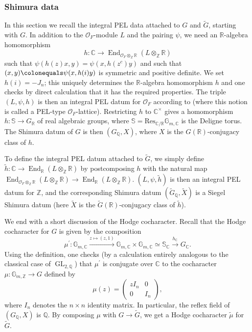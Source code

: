 \documentclass{amsart}
\theoremstyle{remark}
\numberwithin{equation}{subsection}
\def\C{\CC}
\newcommand{\Q}{\QQ}
\newcommand{\R}{\RR}
\newcommand{\Z}{\ZZ}
\newcommand{\CC}{{\mathbb C}}
\newcommand{\GG}{{\mathbb G}}
\newcommand{\QQ}{{\mathbb Q}}
\newcommand{\RR}{{\mathbb R}}
\renewcommand{\SS}{{\mathbb S}}
\newcommand{\ZZ}{{\mathbb Z}}
\newcommand{\cO}{{\mathcal O}}
\DeclareMathOperator{\End}{End}
\DeclareMathOperator{\GL}{GL}
\newcommand{\tG}{\widetilde{G}}
\newcommand{\wt}{\widetilde}
\newcommand{\defeq}{\colonequals}
\renewcommand{\(}{\left(}
\renewcommand{\)}{\right)}
\begin{document}
\subsubsection{Shimura data}\label{subsubsect:Sh_datum}
In this section we recall the integral PEL data attached to $G$ and $\tG$, starting with $G$. In addition to the $\cO_F$-module $L$ and the pairing $\psi$, we need an $\R$-algebra homomorphism
\[
h \colon \C \to \End_{\cO_F \otimes_\Z \R}(L\otimes_\Z \R)
\] 
such that $\psi(h(z)x,y)=\psi(x,h(z^c)y)$ and such that $(x,y) \defeq \psi(x,h(i)y)$ is symmetric and positive definite. We set $h(i) = -J_n$; this uniquely determines the $\R$-algebra homomorphism $h$ and one checks by direct calculation that it has the required properties. The triple $(L,\psi,h)$ is then an integral PEL datum for $\cO_F$ according to \cite[Definition 1.2.13]{lan-thesis} (where this notion is called a PEL-type $\cO_F$-lattice). Restricting $h$ to $\C^\times$ gives a homomorphism $h : \SS \to G_{\R}$ of real algebraic groups, where $\SS = \mathrm{Res}_{\C/\R}\GG_{m,\C}$ is the Deligne torus. The Shimura datum of $G$ is then $(G_\Q, X)$, where $X$ is the $G(\R)$-conjugacy class of $h$. 

\medskip

To define the integral PEL datum attached to $\tG$, we simply define $\wt{h} : \C \to \End_{\R}(L\otimes_\Z \R)$ by postcomposing $h$ with the natural map $\End_{\cO_F \otimes_\Z \R}(L\otimes_\Z \R) \to \End_{ \R}(L\otimes_\Z \R)$. $(L,\psi,\wt{h})$ is then an integral PEL datum for $\Z$, and the corresponding Shimura datum $(\tG_\Q,\wt{X})$ is a Siegel Shimura datum (here $\wt{X}$ is the $\tG(\R)$-conjugacy class of $\wt{h}$). 

\medskip

We end with a short discussion of the Hodge cocharacter. Recall that the Hodge cocharacter for $G$ is given by the composition
\[ \mu^\prime \colon \GG_{m,\CC} \xrightarrow{z \mapsto (z,1)} \GG_{m,\CC} \times \GG_{m,\CC} \simeq \SS_\CC \xrightarrow{h_\CC} G_\CC. \] 
Using the definition, one checks (by a calculation entirely analogous to the classical case of $\GL_{2,\Q}$) that $\mu^\prime$ is conjugate over $\C$ to the cocharacter $\mu : \GG_{m,\Z} \to G$ defined by 
\[
\mu(z) = \begin{pmatrix} zI_n & 0 \\ 0 & I_n \end{pmatrix},
\]
\medskip
where $I_n$ denotes the $n \times n$ identity matrix. In particular, the reflex field of $(G_\Q,X)$ is $\Q$. By composing $\mu$ with $G \to \tG$, we get a Hodge cocharacter $\wt{\mu}$ for $\tG$. 
\end{document}
